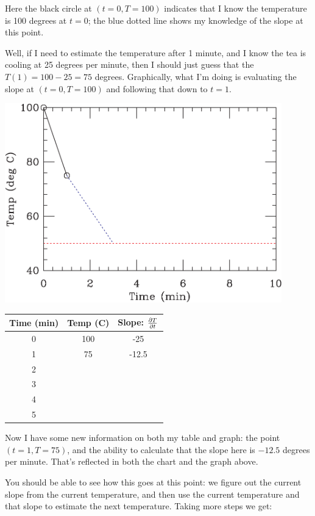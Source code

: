 \documentclass[12ampt]{article}
\def\PAR#1#2{ {{\partial #1}\over{\partial #2}} }
\begin{document}
Here the black circle at $(t=0,T=100)$ indicates that I know the temperature is 
100 degrees at $t=0$; the blue dotted line shows my knowledge of the slope at this
point. 

Well, if I need to estimate the temperature after 1 minute, and I know the tea
is cooling at 25 degrees per minute, then I should just guess that the $T(1) = 
100 - 25 =75$ degrees. Graphically, what I'm doing is evaluating the slope at 
$(t=0, T=100)$ and following that down to $t=1$. 

\begin{minipage}{0.5\textwidth}
\includegraphics[width=0.9\textwidth]{fig1-crop.pdf}
\end{minipage}
\begin{minipage}{0.5\textwidth}
\begin{tabular}{|c | c | c |}
\hline
Time (min) & Temp (C) & Slope: $\PAR{T}{t}$ \\
\hline
0 & 100 & -25 \\
\hline
1 & 75 &  -12.5\\
\hline
2 & &  \\
\hline
3 & &  \\
\hline
4 & &  \\
\hline
5 & &  \\
\hline
\end{tabular}
\end{minipage}

Now I have some new information on both my table and graph: the point 
$(t=1,T=75)$, and the ability to calculate that the slope here is $-12.5$ degrees
per minute. That's reflected in both the chart and the graph above. 

You should be able to see how this goes at this point: we figure out the current
slope from the current temperature, and then use the current temperature and 
that slope to estimate the next temperature. Taking more steps we get:
\end{document}
